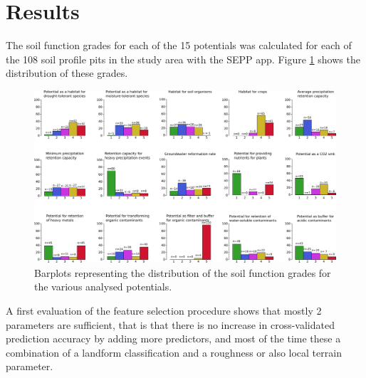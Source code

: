 \documentclass[preprint,12pt,authoryear]{elsarticle}
\begin{document}
\section{Results}
The soil function grades for each of the 15 potentials was calculated for each of the 108 soil profile pits in the study area with the SEPP app. Figure \ref{fig:SFdistro} shows the distribution of these grades.
 \begin{figure}[ht!]
\includegraphics[width=\textwidth,angle=0]{soilfunctiondistro.pdf}
\caption{Barplots representing the distribution of the soil function grades for the various analysed potentials. }
\label{fig:SFdistro}
\end{figure}
A first evaluation of the feature selection procedure shows that mostly 2 parameters are sufficient, that is that there is no increase in cross-validated prediction accuracy  by adding more predictors, and most of the time these a combination of a landform classification and a roughness or also local terrain parameter.
\begin{table}[!htbp]

\caption{Accuracy values (\%) for the different potentials}
\label{table:cvacc}
\end{table}
\end{document}

